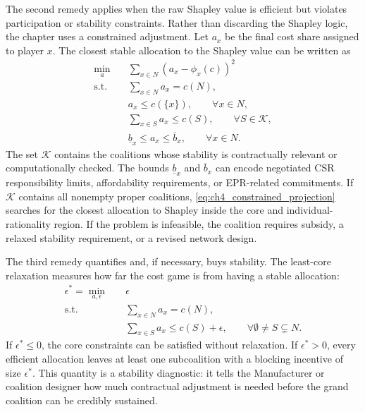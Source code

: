 The second remedy applies when the raw Shapley value is efficient but violates participation or stability constraints. Rather than discarding the Shapley logic, the chapter uses a constrained adjustment. Let $a_x$ be the final cost share assigned to player $x$. The closest stable allocation to the Shapley value can be written as
\begin{equation}
\label{eq:ch4_constrained_projection}
\begin{aligned}
\min_{a}\quad
& \sum_{x\in N}\left(a_x-\phi_x(c)\right)^2\\
\text{s.t.}\quad
& \sum_{x\in N}a_x=c(N),\\
& a_x\leq c(\{x\}), \qquad \forall x\in N,\\
& \sum_{x\in S}a_x\leq c(S), \qquad \forall S\in\mathcal{K},\\
& \underline b_x\leq a_x\leq \overline b_x, \qquad \forall x\in N.
\end{aligned}
\end{equation}
The set $\mathcal{K}$ contains the coalitions whose stability is contractually relevant or computationally checked. The bounds $\underline b_x$ and $\overline b_x$ can encode negotiated CSR responsibility limits, affordability requirements, or EPR-related commitments. If $\mathcal{K}$ contains all nonempty proper coalitions, \eqref{eq:ch4_constrained_projection} searches for the closest allocation to Shapley inside the core and individual-rationality region. If the problem is infeasible, the coalition requires subsidy, a relaxed stability requirement, or a revised network design.

The third remedy quantifies and, if necessary, buys stability. The least-core relaxation measures how far the cost game is from having a stable allocation:
\begin{equation}
\label{eq:ch4_least_core}
\begin{aligned}
\epsilon^*=\min_{a,\epsilon}\quad & \epsilon\\
\text{s.t.}\quad
& \sum_{x\in N}a_x=c(N),\\
& \sum_{x\in S}a_x\leq c(S)+\epsilon,
\qquad \forall \emptyset\neq S\subsetneq N.
\end{aligned}
\end{equation}
If $\epsilon^*\leq 0$, the core constraints can be satisfied without relaxation. If $\epsilon^*>0$, every efficient allocation leaves at least one subcoalition with a blocking incentive of size $\epsilon^*$. This quantity is a stability diagnostic: it tells the Manufacturer or coalition designer how much contractual adjustment is needed before the grand coalition can be credibly sustained.

